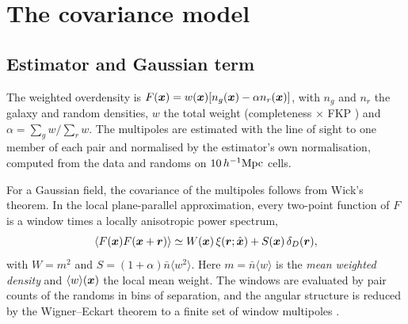 \section{The covariance model}
\label{sec:model}

\subsection{Estimator and Gaussian term}

The weighted overdensity is $F(\boldsymbol{x})=w(\boldsymbol{x})[n_g(\boldsymbol{x})-\alpha n_r(\boldsymbol{x})]$, with $n_g$ and $n_r$ the galaxy and random densities, $w$ the total weight (completeness $\times$ FKP \cite{FKP1994}) and $\alpha=\sum_g w/\sum_r w$. The multipoles are estimated with the line of sight to one member of each pair and normalised by the estimator's own normalisation, computed from the data and randoms on $10\,h^{-1}\mathrm{Mpc}$ cells.

For a Gaussian field, the covariance of the multipoles follows from Wick's theorem. In the local plane-parallel approximation, every two-point function of $F$ is a window times a locally anisotropic power spectrum,
\begin{equation}
  \langle F(\boldsymbol{x})F(\boldsymbol{x}+\boldsymbol{r})\rangle \simeq W(\boldsymbol{x})\,\xi(\boldsymbol{r};\hat{\boldsymbol{x}}) + S(\boldsymbol{x})\,\delta_D(\boldsymbol{r}),
  \label{eq:local}
\end{equation}
with $W=m^2$ and $S=(1+\alpha)\bar n\langle w^2\rangle$. Here $m=\bar n\langle w\rangle$ is the \emph{mean weighted density} and $\langle w\rangle(\boldsymbol{x})$ the local mean weight. The windows are evaluated by pair counts of the randoms in bins of separation, and the angular structure is reduced by the Wigner--Eckart theorem to a finite set of window multipoles .

